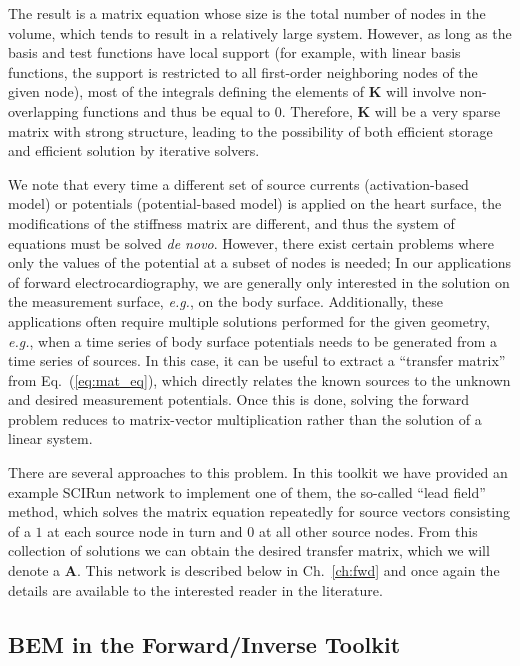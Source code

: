 The result is a matrix equation whose size is the total number of nodes in
the volume, which tends to result in a relatively large system. However, as
long as the basis and test functions have local support (for example, with
linear basis functions, the support is restricted to all first-order
neighboring nodes of the given node), most of the integrals defining the
elements of $\mathbf{K}$ will involve non-overlapping functions and thus be
equal to $0$. Therefore, $\mathbf{K}$ will be a very sparse matrix with
strong structure, leading to the possibility of both efficient storage and
efficient solution by iterative solvers.

We note that every time a different set of source currents
(activation-based model) or potentials (potential-based model) is applied
on the heart surface, the modifications of the stiffness matrix are
different, and thus the system of equations must be solved \textit{de
novo}.
However, there exist certain problems where only the values of the potential at
a subset of nodes is needed; In our applications of forward electrocardiography,
we are generally only interested in the solution on the measurement
surface, \textit{e.g.}, on the body surface. Additionally, these applications often
require multiple solutions performed for the given geometry, \textit{e.g.},
when a time series of body surface potentials needs to be generated
from a time series of sources.
In this case, it can be useful to extract a ``transfer matrix''
from Eq.~(\ref{eq:mat_eq}), which directly relates the known sources to the
unknown and desired measurement potentials. Once this is done, solving the
forward problem reduces to matrix-vector multiplication rather than the
solution of a linear system.

There are several approaches to this problem. In this toolkit we have
provided an example SCIRun network to implement one of them, the so-called
``lead field'' method, which solves the matrix equation repeatedly for
source vectors consisting of a $1$ at each source node in turn and $0$ at
all other source nodes. From this collection of solutions we can obtain the
desired transfer matrix, which we will denote a $\mathbf{A}$. This network is described below in
Ch.~\ref{ch:fwd} and once again the details are available to the interested
reader in the literature.

\subsection{BEM in the Forward/Inverse Toolkit}

